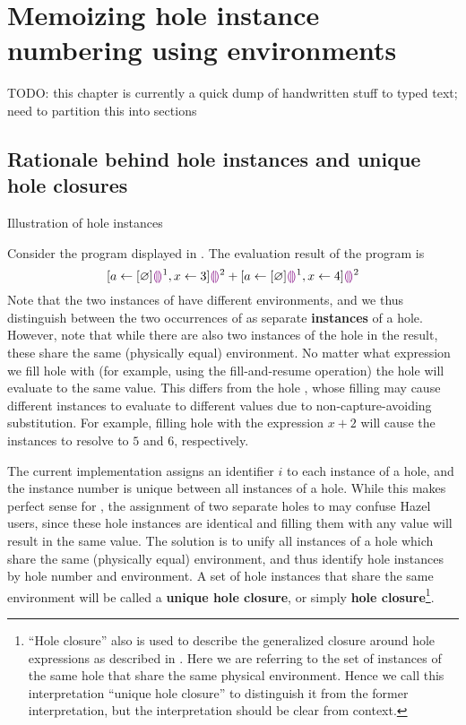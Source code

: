 \chapter{Memoizing hole instance numbering using environments}
\label{sec:renumbering}

TODO: this chapter is currently a quick dump of handwritten stuff to typed text; need to partition this into sections

\section{Rationale behind hole instances and unique hole closures}
\label{sec:instance-illustration}


\begin{listing}
\caption{Illustration of hole instances}
\label{fig:instance-illustration}
\end{listing}

Consider the program displayed in . The evaluation result of the program is \[
[a\leftarrow[\varnothing]\textcolor{violet}{\llparenthesis}\textcolor{violet}{\rrparenthesis}^1,x\leftarrow 3]\textcolor{violet}{\llparenthesis}\textcolor{violet}{\rrparenthesis}^2
+ [a\leftarrow[\varnothing]\textcolor{violet}{\llparenthesis}\textcolor{violet}{\rrparenthesis}^1,x\leftarrow 4]\textcolor{violet}{\llparenthesis}\textcolor{violet}{\rrparenthesis}^2
\] Note that the two instances of  have different environments, and we thus distinguish between the two occurrences of  as separate \textbf{instances} of a hole. However, note that while there are also two instances of the hole  in the result, these share the same (physically equal) environment. No matter what expression we fill hole  with (for example, using the fill-and-resume operation) the hole will evaluate to the same value. This differs from the hole , whose filling may cause different instances to evaluate to different values due to non-capture-avoiding substitution. For example, filling hole  with the expression $x+2$ will cause the instances to resolve to $5$ and $6$, respectively.

The current implementation assigns an identifier $i$ to each instance of a hole, and the instance number is unique between all instances of a hole. While this makes perfect sense for , the assignment of two separate holes to  may confuse Hazel users, since these hole instances are identical and filling them with any value will result in the same value. The solution is to unify all instances of a hole which share the same (physically equal) environment, and thus identify hole instances by hole number and environment. A set of hole instances that share the same environment will be called a \textbf{unique hole closure}, or simply \textbf{hole closure}\footnote{``Hole closure'' also is used to describe the generalized closure around hole expressions as described in . Here we are referring to the set of instances of the same hole that share the same physical environment. Hence we call this interpretation ``unique hole closure'' to distinguish it from the former interpretation, but the interpretation should be clear from context.}.

